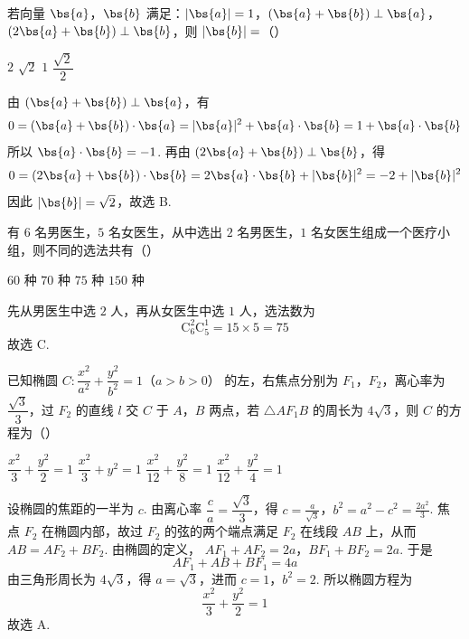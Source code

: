 \begin{problem}
若向量 \(\bs{a}\)，\(\bs{b}\) 满足：\(|\bs{a}| = 1\)，\((\bs{a} + \bs{b}) \perp \bs{a}\)，\((2\bs{a} + \bs{b}) \perp \bs{b}\)，则 \(|\bs{b}| =\)（\quad）

\choices
    {\(2\)}
    {\(\sqrt{2}\)}
    {\(1\)}
    {\(\dfrac{\sqrt{2}}{2}\)}

\begin{solution}
由 \((\bs{a}+\bs{b})\perp\bs{a}\)，有
\[
0=(\bs{a}+\bs{b})\cdot\bs{a}=|\bs{a}|^{2}+\bs{a}\cdot\bs{b}
=1+\bs{a}\cdot\bs{b}
\]
所以 \(\bs{a}\cdot\bs{b}=-1\). 再由
\((2\bs{a}+\bs{b})\perp\bs{b}\)，得
\[
0=(2\bs{a}+\bs{b})\cdot\bs{b}=2\bs{a}\cdot\bs{b}+|\bs{b}|^{2}
=-2+|\bs{b}|^{2}
\]
因此 \(|\bs{b}|=\sqrt{2}\)，故选 B.
\end{solution}
\end{problem}

\begin{problem}
有 \(6\text{ 名}\)男医生，\(5\text{ 名}\)女医生，从中选出 \(2\text{ 名}\)男医生，\(1\text{ 名}\)女医生组成一个医疗小组，则不同的选法共有（\quad）

\choices
    {\(60\text{ 种}\)}
    {\(70\text{ 种}\)}
    {\(75\text{ 种}\)}
    {\(150\text{ 种}\)}

\begin{solution}
先从男医生中选 \(2\) 人，再从女医生中选 \(1\) 人，选法数为
\[
\mathrm C_{6}^{2}\mathrm C_{5}^{1}=15\times5=75
\]
故选 C.
\end{solution}
\end{problem}

\begin{problem}
已知椭圆 \(C: \dfrac{x^{2}}{a^{2}}+\dfrac{y^{2}}{b^{2}}=1\)（\(a>b>0\)） 的左，右焦点分别为 \(F_{1}\)，\(F_{2}\)，离心率为 \(\dfrac{\sqrt{3}}{3}\)，过 \(F_{2}\) 的直线 \(l\) 交 \(C\) 于 \(A\)，\(B\) 两点，若 \(\triangle AF_{1}B\) 的周长为 \(4\sqrt{3}\)，则 \(C\) 的方程为（\quad）

\choices
    {\(\dfrac{x^{2}}{3}+\dfrac{y^{2}}{2}=1\)}
    {\(\dfrac{x^{2}}{3}+y^{2}=1\)}
    {\(\dfrac{x^{2}}{12}+\dfrac{y^{2}}{8}=1\)}
    {\(\dfrac{x^{2}}{12}+\dfrac{y^{2}}{4}=1\)}

\begin{solution}
设椭圆的焦距的一半为 \(c\). 由离心率
\(\dfrac{c}{a}=\dfrac{\sqrt{3}}{3}\)，得
\(c=\frac{a}{\sqrt{3}}\)，\(b^{2}=a^{2}-c^{2}=\frac{2a^{2}}{3}\).
焦点 \(F_{2}\) 在椭圆内部，故过 \(F_{2}\) 的弦的两个端点满足
\(F_{2}\) 在线段 \(AB\) 上，从而 \(AB=AF_{2}+BF_{2}\). 由椭圆的定义，
\(AF_{1}+AF_{2}=2a\)，\(BF_{1}+BF_{2}=2a\).
于是
\[
AF_{1}+AB+BF_{1}=4a
\]
由三角形周长为 \(4\sqrt{3}\)，得 \(a=\sqrt{3}\)，进而
\(c=1\)，\(b^{2}=2\). 所以椭圆方程为
\[
\frac{x^{2}}{3}+\frac{y^{2}}{2}=1
\]
故选 A.
\end{solution}
\end{problem}

